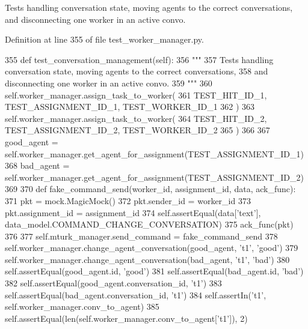 \begin{DoxyVerb}Tests handling conversation state, moving agents to the correct conversations,
and disconnecting one worker in an active convo.
\end{DoxyVerb}
 

Definition at line 355 of file test\+\_\+worker\+\_\+manager.\+py.


\begin{DoxyCode}
355     \textcolor{keyword}{def }test\_conversation\_management(self):
356         \textcolor{stringliteral}{"""}
357 \textcolor{stringliteral}{        Tests handling conversation state, moving agents to the correct conversations,}
358 \textcolor{stringliteral}{        and disconnecting one worker in an active convo.}
359 \textcolor{stringliteral}{        """}
360         self.worker\_manager.assign\_task\_to\_worker(
361             TEST\_HIT\_ID\_1, TEST\_ASSIGNMENT\_ID\_1, TEST\_WORKER\_ID\_1
362         )
363         self.worker\_manager.assign\_task\_to\_worker(
364             TEST\_HIT\_ID\_2, TEST\_ASSIGNMENT\_ID\_2, TEST\_WORKER\_ID\_2
365         )
366 
367         good\_agent = self.worker\_manager.get\_agent\_for\_assignment(TEST\_ASSIGNMENT\_ID\_1)
368         bad\_agent = self.worker\_manager.get\_agent\_for\_assignment(TEST\_ASSIGNMENT\_ID\_2)
369 
370         \textcolor{keyword}{def }fake\_command\_send(worker\_id, assignment\_id, data, ack\_func):
371             pkt = mock.MagicMock()
372             pkt.sender\_id = worker\_id
373             pkt.assignment\_id = assignment\_id
374             self.assertEqual(data[\textcolor{stringliteral}{'text'}], data\_model.COMMAND\_CHANGE\_CONVERSATION)
375             ack\_func(pkt)
376 
377         self.mturk\_manager.send\_command = fake\_command\_send
378         self.worker\_manager.change\_agent\_conversation(good\_agent, \textcolor{stringliteral}{'t1'}, \textcolor{stringliteral}{'good'})
379         self.worker\_manager.change\_agent\_conversation(bad\_agent, \textcolor{stringliteral}{'t1'}, \textcolor{stringliteral}{'bad'})
380         self.assertEqual(good\_agent.id, \textcolor{stringliteral}{'good'})
381         self.assertEqual(bad\_agent.id, \textcolor{stringliteral}{'bad'})
382         self.assertEqual(good\_agent.conversation\_id, \textcolor{stringliteral}{'t1'})
383         self.assertEqual(bad\_agent.conversation\_id, \textcolor{stringliteral}{'t1'})
384         self.assertIn(\textcolor{stringliteral}{'t1'}, self.worker\_manager.conv\_to\_agent)
385         self.assertEqual(len(self.worker\_manager.conv\_to\_agent[\textcolor{stringliteral}{'t1'}]), 2)

\end{DoxyCode}

